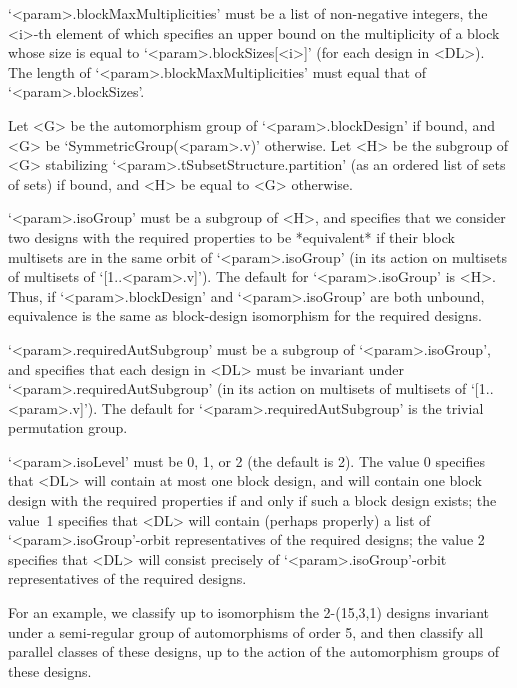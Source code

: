 `<param>.blockMaxMultiplicities' must be a list of non-negative integers,
the <i>-th element of which specifies an upper bound on the multiplicity
of a block whose size is equal to `<param>.blockSizes[<i>]' (for each
design in <DL>). The length of `<param>.blockMaxMultiplicities' must
equal that of `<param>.blockSizes'.

Let <G> be the automorphism group of `<param>.blockDesign' if bound, and
<G> be `SymmetricGroup(<param>.v)' otherwise. Let <H> be the subgroup of
<G> stabilizing `<param>.tSubsetStructure.partition' (as an ordered list
of sets of sets) if bound, and <H> be equal to <G> otherwise. 

`<param>.isoGroup' must be a subgroup of <H>, and specifies that we
consider two designs with the required properties to be *equivalent*
if their block multisets are in the same orbit of `<param>.isoGroup'
(in its action on multisets of multisets of `[1..<param>.v]'). The
default for `<param>.isoGroup' is <H>. Thus, if `<param>.blockDesign'
and `<param>.isoGroup' are both unbound, equivalence is the same as
block-design isomorphism for the required designs.

`<param>.requiredAutSubgroup' must be a subgroup of `<param>.isoGroup',
and specifies that each design in <DL> must be invariant under
`<param>.requiredAutSubgroup' (in its action on multisets of multisets of
`[1..<param>.v]'). The default for `<param>.requiredAutSubgroup' is the
trivial permutation group.

`<param>.isoLevel' must be 0, 1, or 2 (the default is 2).  The value
0 specifies that <DL> will contain at most one block design, and will
contain one block design with the required properties if and only if
such a block design exists; the value~1 specifies that <DL> will contain
(perhaps properly) a list of `<param>.isoGroup'-orbit representatives of
the required designs; the value 2 specifies that <DL> will consist
precisely of `<param>.isoGroup'-orbit representatives of the required
designs.

For an example, we classify up to isomorphism the 2-(15,3,1) designs
invariant under a semi-regular group of automorphisms of order 5, and
then classify all parallel classes of these designs, up to the action
of the automorphism groups of these designs.

